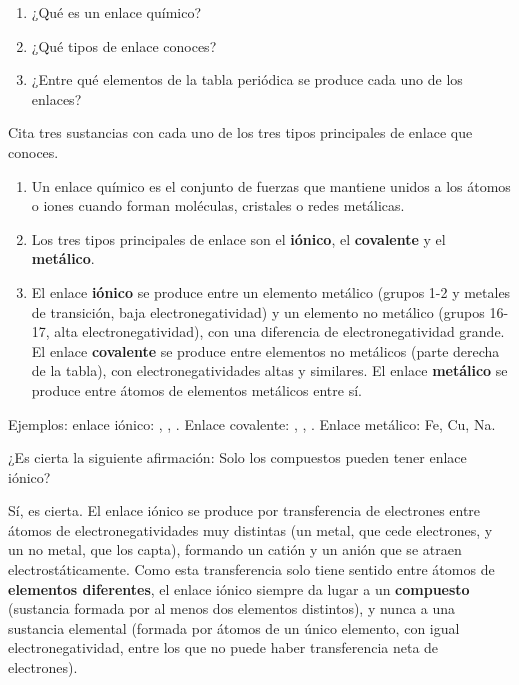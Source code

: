 \begin{exercise}
    \begin{enumerate}[label=\letraminuscula]
        \item ¿Qué es un enlace químico?
        \item ¿Qué tipos de enlace conoces?
        \item ¿Entre qué elementos de la tabla periódica se produce cada uno de los enlaces?
    \end{enumerate}
    Cita tres sustancias con cada uno de los tres tipos principales de enlace que conoces.
    \begin{solu}

        \begin{enumerate}[label=\letraminuscula]
            \item Un enlace químico es el conjunto de fuerzas que mantiene unidos a los átomos o iones cuando forman moléculas, cristales o redes metálicas.
            \item Los tres tipos principales de enlace son el \textbf{iónico}, el \textbf{covalente} y el \textbf{metálico}.
            \item El enlace \textbf{iónico} se produce entre un elemento metálico (grupos 1-2 y metales de transición, baja electronegatividad) y un elemento no metálico (grupos 16-17, alta electronegatividad), con una diferencia de electronegatividad grande. El enlace \textbf{covalente} se produce entre elementos no metálicos (parte derecha de la tabla), con electronegatividades altas y similares. El enlace \textbf{metálico} se produce entre átomos de elementos metálicos entre sí.
        \end{enumerate}

        Ejemplos: enlace iónico: , , . Enlace covalente: , , . Enlace metálico: Fe, Cu, Na.
    \end{solu}
\end{exercise}

\begin{exercise}
    ¿Es cierta la siguiente afirmación: Solo los compuestos pueden tener enlace iónico?
    \begin{solu}

        Sí, es cierta. El enlace iónico se produce por transferencia de electrones entre átomos de electronegatividades muy distintas (un metal, que cede electrones, y un no metal, que los capta), formando un catión y un anión que se atraen electrostáticamente. Como esta transferencia solo tiene sentido entre átomos de \textbf{elementos diferentes}, el enlace iónico siempre da lugar a un \textbf{compuesto} (sustancia formada por al menos dos elementos distintos), y nunca a una sustancia elemental (formada por átomos de un único elemento, con igual electronegatividad, entre los que no puede haber transferencia neta de electrones).
    \end{solu}
\end{exercise}

